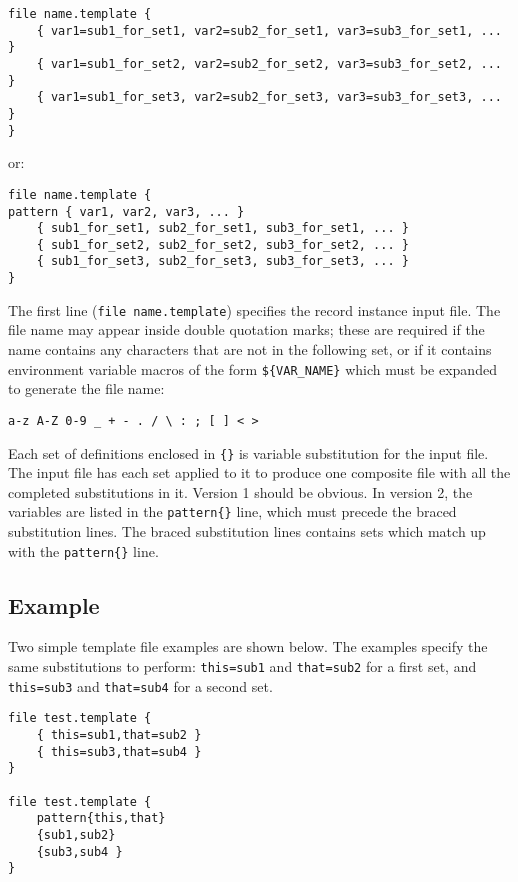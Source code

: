 \begin{verbatim}
file name.template {
    { var1=sub1_for_set1, var2=sub2_for_set1, var3=sub3_for_set1, ... }
    { var1=sub1_for_set2, var2=sub2_for_set2, var3=sub3_for_set2, ... }
    { var1=sub1_for_set3, var2=sub2_for_set3, var3=sub3_for_set3, ... }
}
\end{verbatim}

or:

\begin{verbatim}
file name.template {
pattern { var1, var2, var3, ... }
    { sub1_for_set1, sub2_for_set1, sub3_for_set1, ... }
    { sub1_for_set2, sub2_for_set2, sub3_for_set2, ... }
    { sub1_for_set3, sub2_for_set3, sub3_for_set3, ... }
}
\end{verbatim}

The first line (\verb|file name.template|) specifies the record instance input file. The file name may appear inside double
quotation marks; these are required if the name contains any characters that are not in the following set, or if it contains
environment variable macros of the form \verb|${VAR_NAME}| which must be expanded to generate the file name:

\begin{verbatim}
a-z A-Z 0-9 _ + - . / \ : ; [ ] < >
\end{verbatim}

Each set of definitions enclosed in \verb|{}| is variable substitution for the input file. The input file has each set applied to it to
produce one composite file with all the completed substitutions in it. Version 1 should be obvious. In version 2, the
variables are listed in the \verb|pattern{}| line, which must precede the braced substitution lines. The braced substitution
lines contains sets which match up with the \verb|pattern{}| line.

\subsection{Example}

Two simple template file examples are shown below. The examples specify the same substitutions to perform: 
\verb|this=sub1| and \verb|that=sub2| for a first set, and \verb|this=sub3| and \verb|that=sub4| for a second set. 

\begin{verbatim}
file test.template {
    { this=sub1,that=sub2 }
    { this=sub3,that=sub4 }
}

file test.template {
    pattern{this,that}
    {sub1,sub2}
    {sub3,sub4 }
}
\end{verbatim}

